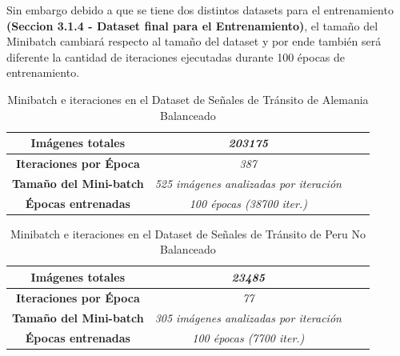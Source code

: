 		Sin embargo debido a que se tiene dos distintos datasets para el entrenamiento \textbf{(Seccion 3.1.4 - Dataset final para el Entrenamiento)}, el tamaño del Minibatch cambiará respecto al tamaño del dataset y por ende también será diferente la cantidad de iteraciones ejecutadas durante 100 épocas de entrenamiento.                        
		

		\begin{table}[H]
			\begin{center}
			\caption{\small{Minibatch e iteraciones en el Dataset de Señales de Tránsito de Alemania Balanceado}}
			\begin{tabular}{|>{\scriptsize}c|>{\scriptsize}c|>{\scriptsize}c|>{\scriptsize}c|}
			\hline
			\textbf{Imágenes totales }                 &\textit{203175}                       \\ \hline
			\textbf{Iteraciones por Época}                 &\textit{387}                             \\ \hline
			\textbf{Tamaño del Mini-batch}                 &\textit{525 imágenes analizadas por iteración}                       \\ \hline
			\textbf{Épocas entrenadas}                &\textit{100 épocas (38700 iter.)}                       \\ \hline
			\end{tabular}
			\end{center}
		\end{table}


		\begin{table}[H]
			\begin{center}
			\caption{\small{Minibatch e iteraciones en el Dataset de Señales de Tránsito de Peru No Balanceado}}
			\begin{tabular}{|>{\scriptsize}c|>{\scriptsize}c|>{\scriptsize}c|>{\scriptsize}c|}
			\hline
			\textbf{Imágenes totales }                 &\textit{23485}                       \\ \hline
			\textbf{Iteraciones por Época}                 &\textit{77}                             \\ \hline
			\textbf{Tamaño del Mini-batch}                 &\textit{305 imágenes analizadas por iteración}                       \\ \hline
			\textbf{Épocas entrenadas}                &\textit{100 épocas (7700 iter.)}                       \\ \hline
			\end{tabular}
			\end{center}
		\end{table}


